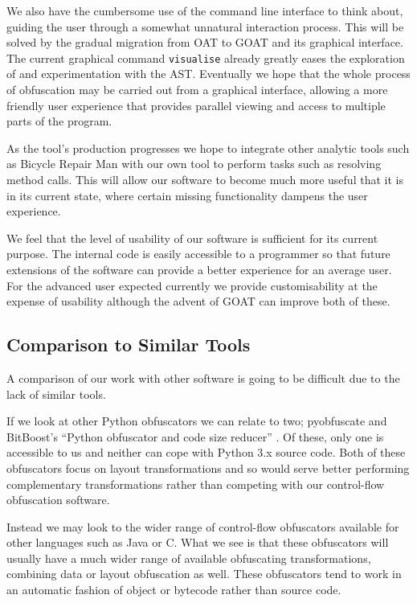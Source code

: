 \documentclass[twoside,a4paper]{report}
\begin{document}
We also have the cumbersome use of the command line interface to think about, guiding the user through a somewhat unnatural interaction process. This will be
solved by the gradual migration from OAT to GOAT and its graphical interface. The current graphical command \texttt{visualise} already greatly eases the
exploration of and experimentation with the AST. Eventually we hope that the whole process of obfuscation may be carried out from a graphical interface,
allowing a more friendly user experience that provides parallel viewing and access to multiple parts of the program.

As the tool's production progresses we hope to integrate other analytic tools such as Bicycle Repair Man \cite{bikerepair} with our own tool to
perform tasks such as resolving method calls. This will allow our software to become much more useful that it is in its current state, where certain
missing functionality dampens the user experience.

We feel that the level of usability of our software is sufficient for its current purpose. The internal code is easily accessible to a programmer so that
future extensions of the software can provide a better experience for an average user. For the advanced user expected currently we provide customisability
at the expense of usability although the advent of GOAT can improve both of these.

\subsection{Comparison to Similar Tools}

A comparison of our work with other software is going to be difficult due to the lack of similar tools.

If we look at other Python obfuscators we can relate to two; pyobfuscate \cite{pyobf} and BitBoost's
``Python obfuscator and code size reducer'' \cite{bitboost}. Of these, only one is accessible to us and
neither can cope with Python 3.x source code. Both of these obfuscators focus on layout transformations
and so would serve better performing complementary transformations rather than competing with our
control-flow obfuscation software.

Instead we may look to the wider range of control-flow obfuscators available for other languages such as
Java or C. What we see is that these obfuscators will usually have a much wider range of available
obfuscating transformations, combining data or layout obfuscation as well. These obfuscators tend to
work in an automatic fashion of object or bytecode rather than source code.
\end{document}
